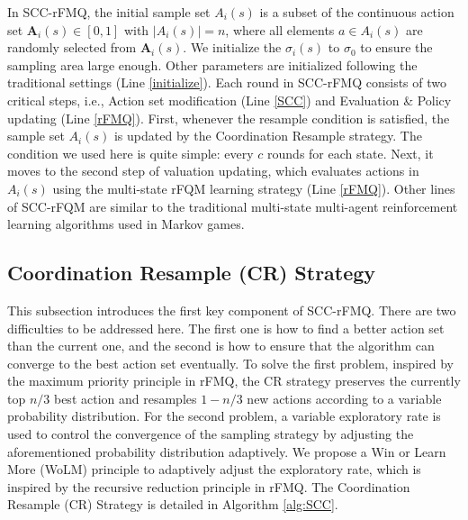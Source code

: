 \documentclass[journal,transmag]{IEEEtran}
\begin{document}
In SCC-rFMQ, the initial sample set $A_i(s)$ is a subset of the continuous action set $\mathbf{A}_i(s)\in [0,1]$ with $|A_i(s)|=n$, where all elements $a\in A_i(s)$ are randomly selected from $\mathbf{A}_i(s)$. We initialize the $\sigma_i(s)$ to $\sigma_0$ to ensure the sampling area large enough. Other parameters are initialized following the traditional settings \cite{Matignon2012} (Line \ref{initialize}). Each round in SCC-rFMQ consists of two critical steps, i.e., Action set modification (Line \ref{SCC}) and Evaluation \& Policy updating (Line \ref{rFMQ}). First, whenever the resample condition is satisfied, the sample set $A_i(s)$ is updated by the Coordination Resample strategy. The condition we used here is quite simple: every $c$ rounds for each state. %
Next, it moves to the second step of valuation updating, which evaluates actions in $A_i(s)$ using the multi-state rFQM learning strategy (Line \ref{rFMQ}). Other lines of SCC-rFQM are similar to the traditional multi-state multi-agent reinforcement learning algorithms used in Markov games.%

\subsection{Coordination Resample (CR) Strategy}

This subsection introduces the first key component of SCC-rFMQ. There are two difficulties to be addressed here. The first one is how to find a better action set than the current one, and the second is how to ensure that the algorithm can converge to the best action set eventually. To solve the first problem, inspired by the maximum priority principle in rFMQ, the CR strategy preserves the currently top $n/3$ best action and resamples $1-n/3$ new actions according to a variable probability distribution. For the second problem, a variable exploratory rate is used to control the convergence of the sampling strategy by adjusting the aforementioned probability distribution adaptively. We propose a Win or Learn More (WoLM) principle to adaptively adjust the exploratory rate, which is inspired by the recursive reduction principle in rFMQ. The Coordination Resample (CR) Strategy is detailed in Algorithm \ref{alg:SCC}.
\end{document}
